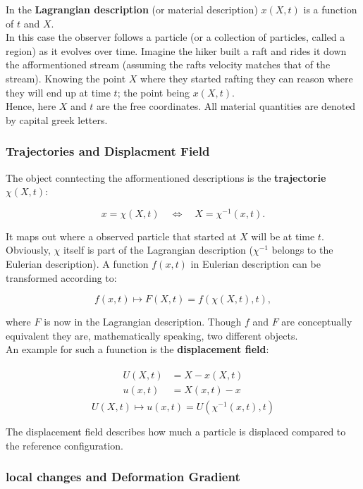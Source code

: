 \documentclass[../../main.tex]{subfiles}
\begin{document}
In the \textbf{Lagrangian description} (or material description) $x(X,t)$ is a function of $t$ and $X$. \\

In this case the observer follows a particle (or a collection of particles, called a region) as it evolves over time. Imagine the hiker built a raft and rides it down the afformentioned stream (assuming the rafts velocity matches that of the stream). Knowing the point $X$ where they started rafting they can reason where they will end up at time $t$; the point being $x(X,t)$. \\

Hence, here $X$ and $t$ are the free coordinates. All material quantities are denoted by capital greek letters.\\

\subsubsection{Trajectories and Displacment Field}

The object conntecting the afformentioned descriptions is the \textbf{trajectorie $\chi(X,t)$}:

\begin{equation}
x = \chi(X,t) \quad \Leftrightarrow \quad X = \chi^{-1}(x,t).
\end{equation}

It maps out where a observed particle that started at $X$ will be at time $t$. Obviously, $\chi$ itself is part of the Lagrangian description ($\chi^{-1}$ belongs to the Eulerian description). A function $f(x,t)$ in Eulerian description can be transformed according to:

\begin{equation}
f(x,t) \mapsto F (X,t) = f(\chi(X,t), t),
\end{equation}

where $F$ is now in the Lagrangian description. Though $f$ and $F$ are conceptually equivalent they are, mathematically speaking, two different objects. \\

An example for such a fuunction is the \textbf{displacement field}:

\begin{align}
\begin{split}
U(X,t) &= X - x(X,t) \\
u(x,t) &= X(x,t) - x
\end{split}
\end{align}
\begin{equation}
U(X,t) \mapsto u(x,t) = U(\chi^{-1}(x,t),t) 
\end{equation}

The displacement field describes how much a particle is displaced compared to the reference configuration. 

\subsubsection{local changes and Deformation Gradient}
\end{document}
